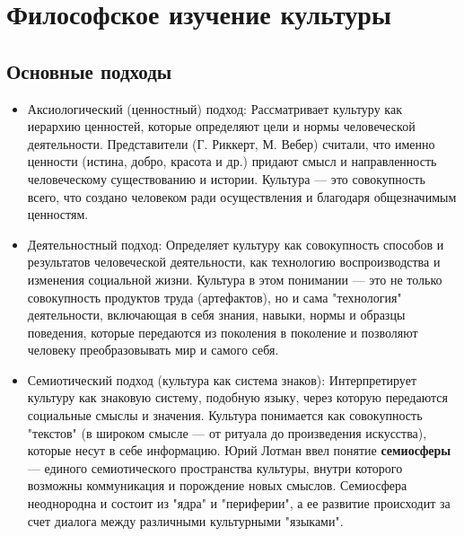 \documentclass[12pt,a4paper]{article}
\begin{document}
	\section{Философское изучение культуры~\checkmark}
	\subsection{Основные подходы}
	\begin{itemize}
		\item Аксиологический (ценностный) подход: Рассматривает культуру как иерархию ценностей, которые определяют цели и нормы человеческой деятельности. Представители (Г. Риккерт, М. Вебер) считали, что именно ценности (истина, добро, красота и др.) придают смысл и направленность человеческому существованию и истории. Культура --- это совокупность всего, что создано человеком ради осуществления и благодаря общезначимым ценностям.
		\item Деятельностный подход: Определяет культуру как совокупность способов и результатов человеческой деятельности, как технологию воспроизводства и изменения социальной жизни. Культура в этом понимании --- это не только совокупность продуктов труда (артефактов), но и сама "технология" деятельности, включающая в себя знания, навыки, нормы и образцы поведения, которые передаются из поколения в поколение и позволяют человеку преобразовывать мир и самого себя.
		\item Семиотический подход (культура как система знаков): Интерпретирует культуру как знаковую систему, подобную языку, через которую передаются социальные смыслы и значения. Культура понимается как совокупность "текстов" (в широком смысле --- от ритуала до произведения искусства), которые несут в себе информацию. Юрий Лотман ввел понятие \textbf{семиосферы} --- единого семиотического пространства культуры, внутри которого возможны коммуникация и порождение новых смыслов. Семиосфера неоднородна и состоит из "ядра" и "периферии", а ее развитие происходит за счет диалога между различными культурными "языками".
	\end{itemize}
	
\end{document}
